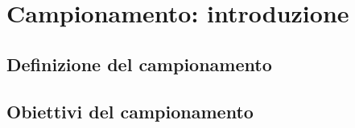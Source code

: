 \chapter{Campionamento: introduzione}

\section{Definizione del campionamento}

\section{Obiettivi del campionamento}
